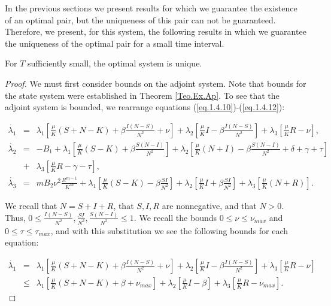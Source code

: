 In the previous sections we present results for which we guarantee the existence of an optimal pair, but the uniqueness of this pair can not be guaranteed. Therefore, we present, for this system, the following results in which we guarantee the uniqueness of the optimal pair for a small time interval.

\begin{theorem}
	For $T$ sufficiently small, the optimal system is unique.
\end{theorem}
\begin{proof}
We must first consider bounds on the adjoint system. Note that bounds for the state system were established in Theorem \ref{Teo.Ex.Ap}. To see that the adjoint system is bounded, we rearrange equations (\ref{eq.1.4.10})-(\ref{eq.1.4.12}):

\begin{eqnarray*}
\dot{\lambda_1}&=& \lambda_1\left[\frac{\mu}{K}(S+N-K)+\beta\frac{I(N-S)}{N^2}+\nu\right]+\lambda_2\left[\frac{\mu}{K}I-\beta\frac{I(N-S)}{N^2}\right]+\lambda_3\left[\frac{\mu}{K}R-\nu\right],\\
\dot{\lambda_2}&=& -B_1+\lambda_1\left[\frac{\mu}{K}(S-K)+\beta\frac{S(N-I)}{N^2}\right]+\lambda_2\left[\frac{\mu}{K}(N+I)-\beta\frac{S(N-I)}{N^2}+\delta+\gamma+\tau \right]\\
&+&\lambda_3\left[\frac{\mu}{K}R-\gamma-\tau\right],\\
\dot{\lambda_3}&=& mB_2\nu^2\frac{R^{m-1}}{K^m}+\lambda_1\left[\frac{\mu}{K}(S-K)-\beta\frac{SI}{N^2}\right]+\lambda_2\left[\frac{\mu}{K}I+\beta\frac{SI}{N^2}\right]+\lambda_3\left[\frac{\mu}{K}(N+R)\right].
\end{eqnarray*}

We recall that $N=S+I+R$, that $S,I,R$ are nonnegative, and that $N>0$. Thus, $0\leq \frac{I(N-S)}{N^2},\frac{SI}{N^2},\frac{S(N-I)}{N^2}\leq 1$. We recall the bounds $0\leq \nu\leq \nu_{max}$ and $0\leq \tau \leq \tau_{max}$, and with this substitution we see the following bounds for each equation:

\begin{eqnarray*}
\dot{\lambda_1}&=& \lambda_1\left[\frac{\mu}{K}(S+N-K)+\beta\frac{I(N-S)}{N^2}+\nu\right]+\lambda_2\left[\frac{\mu}{K}I-\beta\frac{I(N-S)}{N^2}\right]+\lambda_3\left[\frac{\mu}{K}R-\nu\right]\\
&\leq& \lambda_1\left[\frac{\mu}{K}(S+N-K)+\beta+\nu_{max}\right]+\lambda_2\left[\frac{\mu}{K}I-\beta\right]+\lambda_3\left[\frac{\mu}{K}R-\nu_{max}\right].
\end{eqnarray*}


\end{proof}
